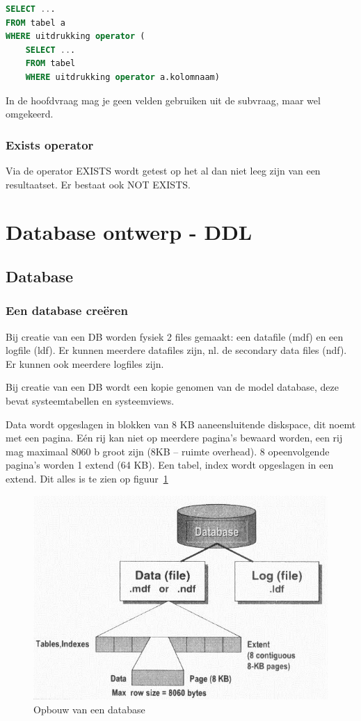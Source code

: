 \documentclass[a4paper,12pt]{article}
\begin{document}
\begin{lstlisting}[language=sql]
SELECT ...
FROM tabel a
WHERE uitdrukking operator (
	SELECT ...
	FROM tabel
	WHERE uitdrukking operator a.kolomnaam)
\end{lstlisting}
In de hoofdvraag mag je geen velden gebruiken uit de subvraag, maar wel omgekeerd.

\subsubsection{Exists operator}
Via de operator EXISTS wordt getest op het al dan niet leeg zijn van een resultaatset. Er bestaat ook NOT EXISTS.

\section{Database ontwerp - DDL}
\subsection{Database}
\subsubsection{Een database creëren}
Bij creatie van een DB worden fysiek 2 files gemaakt: een datafile (mdf) en een logfile (ldf).
Er kunnen meerdere datafiles zijn, nl. de secondary data files (ndf).
Er kunnen ook meerdere logfiles zijn.

Bij creatie van een DB wordt een kopie genomen van de model database, deze bevat systeemtabellen en systeemviews.

Data wordt opgeslagen in blokken van 8 KB aaneensluitende diskspace, dit noemt met een pagina.
Eén rij kan niet op meerdere pagina’s bewaard worden, een rij mag maximaal 8060 b groot zijn (8KB – ruimte overhead).
8 opeenvolgende pagina’s worden 1 extend (64 KB).
Een tabel, index wordt opgeslagen in een extend.
Dit alles is te zien op figuur~\ref{fig:DatabaseCreatie}

\begin{figure}[H]
\centering
  	\includegraphics[width=.5\linewidth]{img/DatabaseCreatie.png}
  	\caption{Opbouw van een database}
  	\label{fig:DatabaseCreatie}
\end{figure}
\end{document}
